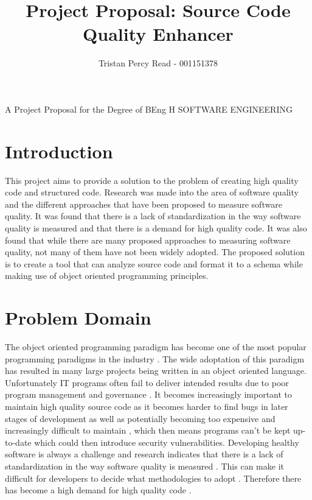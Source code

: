 \documentclass{article} %
\begin{document}

\title{Project Proposal: Source Code Quality Enhancer} %
\author{Tristan Percy Read - 001151378} %

\maketitle %
{
	\centering
	A Project Proposal for the Degree of BEng H SOFTWARE ENGINEERING

} %

\section{Introduction} %
This project aims to provide a solution to the problem of creating high quality code and structured code. Research was made into the area of software quality and the different approaches that have been proposed to measure software quality. It was found that there is a lack of standardization in the way software quality is measured and that there is a demand for high quality code. It was also found that while there are many proposed approaches to measuring software quality, not many of them have not been widely adopted. The proposed solution is to create a tool that can analyze source code and format it to a schema while making use of object oriented programming principles.

\section{Problem Domain}

The object oriented programming paradigm has become one of the most popular programming paradigms in the industry \citep{6606742}. The wide adoptation of this paradigm has resulted in many large projects being written in an object oriented language.
Unfortunately IT programs often fail to deliver intended results due to poor program management and governance \citep{7372958}. It becomes increasingly important to maintain high quality source code as it becomes harder to find bugs in later stages of development \citep{8681007} as well as potentially becoming too expensive and increasingly difficult to maintain \citep{8802820, 10.1145/2507288.2507312, 10.1145/3379597.3387457, 6606742, 7372958}, which then means programs can't be kept up-to-date which could then introduce security vulnerabilities.
Developing healthy software is always a challenge \citep{8681007} and research indicates that there is a lack of standardization in the way software quality is measured \citep{6606742, 8681007}. This can make it difficult for developers to decide what methodologies to adopt \citep{6606742}. Therefore there has become a high demand for high quality code \citep{6606742}.
\end{document}
